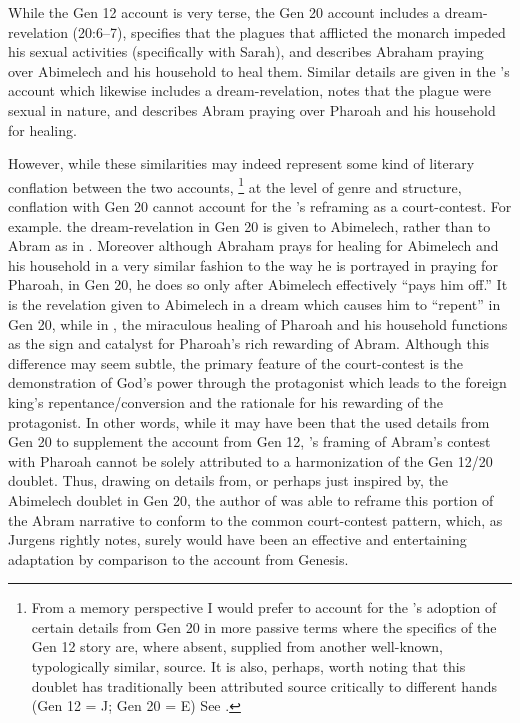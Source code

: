 While the Gen 12 account is very terse, the Gen 20 account includes a dream-revelation (20:6--7), specifies that the plagues that afflicted the monarch impeded his sexual activities (specifically with Sarah), and describes Abraham praying over Abimelech and his household to heal them. Similar details are given in the \ga's account which likewise includes a dream-revelation, notes that the plague were sexual in nature, and describes Abram praying over Pharoah and his household for healing. 

However, while these similarities may indeed represent some kind of literary conflation between the two accounts,%
%
\footnote{From a memory perspective I would prefer to account for the \ga's adoption of certain details from Gen 20 in more passive terms where the specifics of the Gen 12 story are, where absent, supplied from another well-known, typologically similar, source. It is also, perhaps, worth noting that this doublet has traditionally been attributed source critically to different hands (Gen 12 = J; Gen 20 = E) See \cite[15]{driver1956} .} 
%
at the level of genre and structure, conflation with Gen 20 cannot account for the \ga's reframing as a court-contest. For example. the dream-revelation in Gen 20 is given to Abimelech, rather than to Abram as in \ga. Moreover although Abraham prays for healing for Abimelech and his household in a very similar fashion to the way he is portrayed in \ga praying for Pharoah, in Gen 20, he does so only after Abimelech effectively ``pays him off.'' It is the revelation given to Abimelech in a dream which causes him to ``repent'' in Gen 20, while in \ga, the miraculous healing of Pharoah and his household functions as the sign and catalyst for Pharoah's rich rewarding of Abram. Although this difference may seem subtle, the primary feature of the court-contest is the demonstration of God's power through the protagonist which leads to the foreign king's repentance/conversion and the rationale for his rewarding of the protagonist. In other words, while it may have been that the \ga used details from Gen 20 to supplement the account from Gen 12, \ga's framing of Abram's contest with Pharoah cannot be solely attributed to a harmonization of the Gen 12/20 doublet. Thus, drawing on details from, or perhaps just inspired by, the Abimelech doublet in Gen 20, the author of \ga was able to reframe this portion of the Abram narrative to conform to the common court-contest pattern, which, as Jurgens rightly notes, surely would have been an effective and entertaining adaptation by comparison to the account from Genesis.

